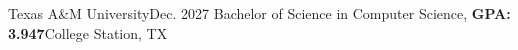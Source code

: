 
\resumeSubHeadingListStart
  \resumeSubheading
    {Texas A\&M University}{Dec. 2027}
    {Bachelor of Science in Computer Science, \textbf{GPA: 3.947}}{College Station, TX}
    \resumeItemListStart
    \resumeItemListEnd
\resumeSubHeadingListEnd
